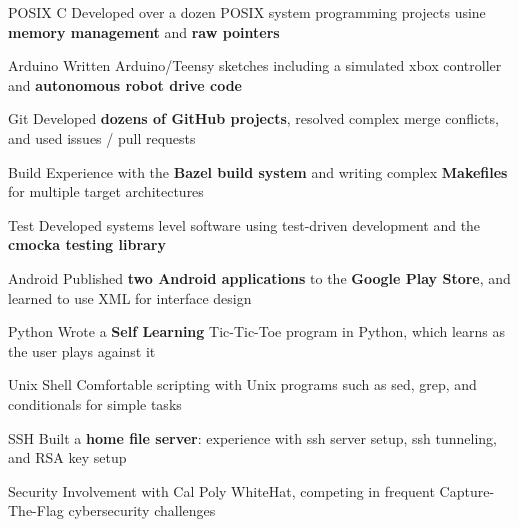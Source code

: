 \begin{cvskills}

 \cvskill
    {POSIX C} %
    {Developed over a dozen POSIX system programming projects usine \textbf{memory management} and \textbf{raw pointers}}%

 \cvskill
    {Arduino} %
    {Written Arduino/Teensy sketches including a simulated xbox controller and \textbf{autonomous robot drive code}} %

 \cvskill
    {Git} %
    {Developed \textbf{dozens of GitHub projects}, resolved complex merge conflicts, and used issues / pull requests} %

 \cvskill
    {Build} %
    {Experience with the \textbf{Bazel build system} and writing complex \textbf{Makefiles} for multiple target architectures} %

 \cvskill
    {Test} %
    {Developed systems level software using test-driven development and the \textbf{cmocka testing library}} %
    
 \cvskill
    {Android} %
    {Published \textbf{two Android applications} to the \textbf{Google Play Store}, and learned to use XML for interface design} %

 
 \cvskill
    {Python} %
    {Wrote a \textbf{Self Learning} Tic-Tic-Toe program in Python, which learns as the user plays against it} %


 \cvskill
    {Unix Shell} %
    {Comfortable scripting with Unix programs such as sed, grep, and conditionals for simple tasks} %

 \cvskill
    {SSH} %
    {Built a \textbf{home file server}: experience with ssh server setup, ssh tunneling, and RSA key setup} %

 \cvskill
    {Security} %
    {Involvement with Cal Poly WhiteHat, competing in frequent Capture-The-Flag cybersecurity challenges} %


\end{cvskills}

